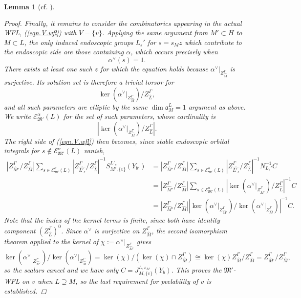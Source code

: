 \documentclass[openany]{amsbook}
\newtheorem{lemma}[theorem]{Lemma}
\theoremstyle{definition}
\theoremstyle{remark}
\numberwithin{equation}{section}
\newcommand{\cE}{\mathcal{E}}
\renewcommand{\-}{\operatorname{-}}
\renewcommand{\a}{\mathfrak{a}}
\newcommand{\fM}{\mathfrak{M}}
\begin{document}
\begin{lemma}[{cf. \cite[Lemme 17.6.2, Lemme 17.8.1]{CLII}}]
\begin{proof}
        Finally, it remains to consider the combinatorics appearing in the actual WFL, (\ref{eqn.V.wfl}) with $V = \{v\}$. Applying the same argument from $M' \subset H$ to $M \subset L$, the only induced endoscopic groups $L_s'$ for $s = s_M z$ which contribute to the endoscopic side are those containing $\alpha$, which occurs precisely when
        $$
            \alpha^\vee(s) = 1.
        $$
        There exists at least one such $z$ for which the equation holds because $\alpha^\vee|_{Z_{\widehat{M}}^\Gamma}$ is surjective. Its solution set is therefore a trivial torsor for
        $$
            \ker\left(\alpha^\vee|_{Z_{\widehat{M}}^\Gamma}\right)/Z_{\widehat{L}}^{\Gamma},
        $$
        and all such parameters are elliptic by the same $\dim \a_M^L = 1$ argument as above. We write $\cE^{\alpha}_{\fM'}(L)$ for the set of such parameters, whose cardinality is
        $$
            \left|\ker\left(\alpha^\vee|_{Z_{\widehat{M}}^\Gamma}\right)/Z_{\widehat{L}}^{\Gamma}\right|.
        $$
        The right side of (\ref{eqn.V.wfl}) then becomes, since stable endoscopic orbital integrals for $s \not\in \cE^{\alpha}_{\fM'}(L)$ vanish,
        \begin{align*}
            |Z^\Gamma_{\widehat{M}'}/ Z_{\widehat{M}}^\Gamma| \sum_{s \in \cE_{\fM'}^{\alpha}(L)} |Z_{\widehat{L'_s}}^\Gamma/ Z_{\widehat{L}}^\Gamma |^{-1} S_{M', \{v\}}^{L'_s}(Y_{b'}) &= |Z^\Gamma_{\widehat{M}'}/ Z_{\widehat{M}}^\Gamma| \sum_{s \in \cE_{\fM'}^{\alpha}(L)} |Z_{\widehat{L'_s}}^\Gamma/ Z_{\widehat{L}}^\Gamma |^{-1} N_{L_s'}^{-1} C \\
            &= |Z^\Gamma_{\widehat{M}'}/ Z_{\widehat{M}}^\Gamma| \sum_{s \in \cE_{\fM'}^{\alpha}(L)} \left|\ker\left( \alpha^\vee|_{Z_{\widehat{M}'}^\Gamma}\right)/Z^\Gamma_{\widehat{L}}\right|^{-1} C \\
            &= |Z^\Gamma_{\widehat{M}'}/ Z_{\widehat{M}}^\Gamma| \left|\ker\left(\alpha^\vee|_{Z_{\widehat{M}'}^\Gamma}\right)/\ker\left(\alpha^\vee|_{Z_{\widehat{M}}^\Gamma}\right)\right|^{-1} C.
        \end{align*}
        Note that the index of the kernel terms is finite, since both have identity component $(Z_{\widehat{L}}^\Gamma)^0$. Since $\alpha^\vee$ is surjective on $Z_{\widehat{M}}^\Gamma$, the second isomorphism theorem applied to the kernel of $\chi := \alpha^\vee|_{Z_{\widehat{M}'}^\Gamma}$ gives
        $$
            \ker\left(\alpha^\vee|_{Z_{\widehat{M}'}^\Gamma}\right)/\ker\left(\alpha^\vee|_{Z_{\widehat{M}}^\Gamma}\right) = \ker(\chi)/\left(\ker(\chi) \cap Z_{\widehat{M}}^\Gamma\right) \cong \ker(\chi) Z_{\widehat{M}}^\Gamma/ Z_{\widehat{M}}^\Gamma = Z_{\widehat{M}'}^\Gamma/Z_{\widehat{M}}^\Gamma,
        $$
        so the scalars cancel and we have only $C = J_{M,\{v\}}^{L,s_M}(Y_b)$. This proves the $\fM'$-WFL on $v$ when $L \supsetneq M$, so the last requirement for peelability of $v$ is established.
    \end{proof}
\end{lemma}
\end{document}
